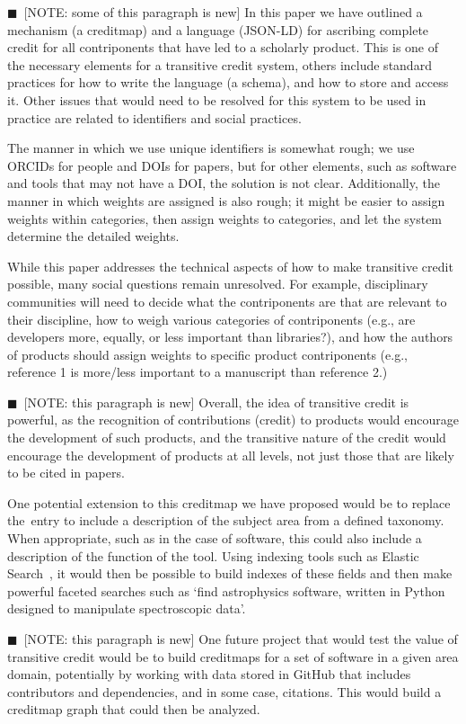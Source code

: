 \documentclass[a4paper,10pt]{article}
\newcommand{\note}[1]{{\color{darkgreen}$\blacksquare$~\textsf{[NOTE: #1]}}}
\begin{document}
\note{some of this paragraph is new}
In this paper we have outlined a mechanism (a creditmap) and a language (JSON-LD) for ascribing complete credit for all contriponents that have led to a scholarly product.
This is one of the necessary elements for a transitive credit system, others include standard practices for
how to write the language (a schema), and how to store and access it. Other issues that would
need to be resolved for this system to be used in practice are related to identifiers and social practices.

The manner in which we use unique identifiers is somewhat rough; we use ORCIDs for people and DOIs for papers, but for other elements, such as software and tools that may not have a DOI, the solution is not clear.
Additionally, the manner in which weights are assigned is also rough; it might be easier to assign weights within categories, then assign weights to categories, and let the system determine the detailed weights.

While this paper addresses the technical aspects of how to make transitive credit possible, many social questions remain unresolved. For example, disciplinary communities will need to decide what the contriponents are that are relevant to their discipline, how to weigh various categories of contriponents (e.g., are developers more, equally, or less important than libraries?), and how the authors of products should assign weights to specific product contriponents (e.g., reference 1 is more/less important to a manuscript than reference 2.) 

\note{this paragraph is new} Overall, the idea of transitive credit is powerful, as the recognition of contributions (credit) to products would encourage the development of such products, and the transitive nature of the credit would encourage the development of products at all levels, not just those that are likely to be cited in papers. 

One potential extension to this creditmap we have proposed would be to replace the~\keywords entry to include a description of the subject area from a defined taxonomy. When appropriate, such as in the case of software, this could also include a description of the function of the tool. Using indexing tools such as Elastic Search~\cite{elasticsearch}, it would then be possible to build indexes of these fields and then make powerful faceted searches such as `find astrophysics software, written in Python designed to manipulate spectroscopic data'.

\note{this paragraph is new} One future project that would test the value of transitive credit would be to build creditmaps for a set of software in a given area domain, potentially by working with data stored in GitHub that includes contributors and dependencies, and in some case, citations. This would build a creditmap graph that could then be analyzed.
\end{document}
